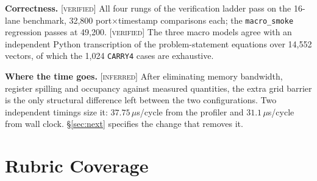 \documentclass[11pt]{article}
\newcommand{\V}{\textcolor{green!35!black}{\scriptsize\textsc{[verified]}}}
\newcommand{\F}{\textcolor{purple!60!black}{\scriptsize\textsc{[inferred]}}}
\newcommand{\code}[1]{\texttt{\small #1}}
\begin{document}
\textbf{Correctness.} \V{} All four rungs of the verification ladder pass on the
16-lane benchmark, 32,800 port$\times$timestamp comparisons each; the
\code{macro\_smoke} regression passes at 49,200. \V{} The three macro models agree
with an independent Python transcription of the problem-statement equations over
14,552 vectors, of which the 1,024 \code{CARRY4} cases are exhaustive.

\textbf{Where the time goes.} \F{} After eliminating memory bandwidth, register
spilling and occupancy against measured quantities, the extra grid barrier is the
only structural difference left between the two configurations. Two independent
timings size it: $37.75\,\mu$s/cycle from the profiler and $31.1\,\mu$s/cycle from
wall clock. \S\ref{sec:next} specifies the change that removes it.

\section{Rubric Coverage}
\end{document}
